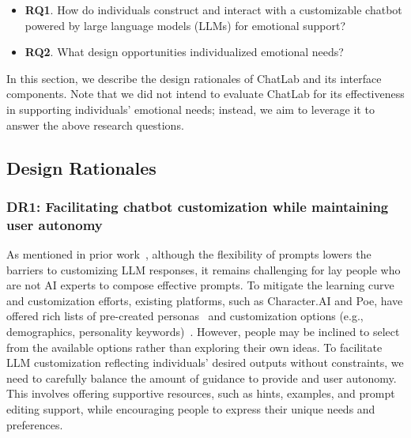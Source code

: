 \begin{itemize}
    \item \textbf{RQ1}. How do individuals construct and interact with a customizable chatbot powered by large language models (LLMs) for emotional support? 
    \item \textbf{RQ2}. What design opportunities  individualized emotional needs? 

\end{itemize}

In this section, we describe the design rationales of ChatLab and its interface components.  
Note that we did not intend to evaluate ChatLab for its effectiveness in supporting individuals' emotional needs; instead, we aim to leverage it  to answer the above research questions. 

\subsection{Design Rationales}

\subsubsection{DR1: Facilitating chatbot customization while maintaining user autonomy}
As mentioned in prior work~\cite{zamfirescu2023johnny, zamfirescu2023herding, li4875898human}, although the flexibility of prompts lowers the barriers to customizing LLM responses, it remains challenging for lay people who are not AI experts to compose effective prompts. To mitigate the learning curve and customization efforts, existing platforms, such as Character.AI and Poe, have offered rich lists of pre-created personas~\cite{characterai, poe} and customization options (e.g., demographics, personality keywords)~\cite{Ha2024Clochat}. However, people may be inclined to select from the available options rather than exploring their own ideas.
To facilitate LLM customization reflecting individuals' desired outputs without constraints, we need to carefully balance the amount of guidance to provide and user autonomy. This involves offering supportive resources, such as hints, examples, and prompt editing support, while encouraging people to express their unique needs and preferences.


